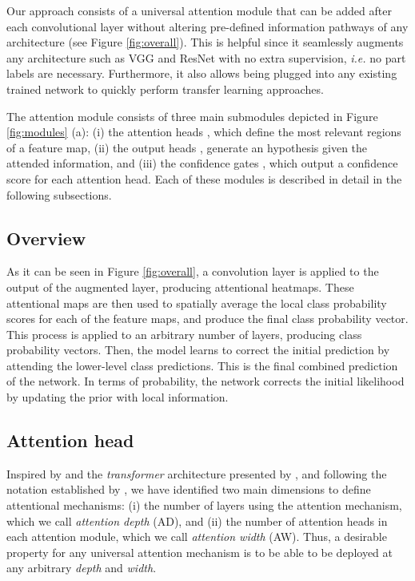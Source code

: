 \documentclass[runningheads]{llncs}
\begin{document}
Our approach consists of a universal attention module that can be added after each convolutional layer without altering pre-defined information pathways of any architecture (see Figure \ref{fig:overall}). This is helpful since it seamlessly augments any architecture such as VGG and ResNet with no extra supervision, \emph{i.e.} no part labels are necessary. Furthermore, it also allows being plugged into any existing trained network to quickly perform transfer learning approaches.

The attention module consists of three main submodules depicted in Figure \ref{fig:modules} (a): (i) the attention heads , which define the most relevant regions of a feature map, (ii) the output heads , generate an hypothesis given the attended information, and (iii) the confidence gates , which output a confidence score for each attention head. Each of these modules is described in detail in the following subsections.

\subsection{Overview}
As it can be seen in Figure \ref{fig:overall}, a convolution layer is applied to the output of the augmented layer, producing  attentional heatmaps. These attentional maps are then used to spatially average the local class probability scores for each of the feature maps, and produce the final class probability vector. This process is applied to an arbitrary number  of layers, producing  class probability vectors. Then, the model learns to correct the initial prediction by attending the lower-level class predictions. This is the final combined prediction of the network. In terms of probability, the network corrects the initial likelihood by updating the prior with local information.

\subsection{Attention head}
Inspired by \cite{zhao2017diversified} and the \emph{transformer} architecture presented by \cite{vaswani2017attention}, and following the notation established by \cite{Zagoruyko2016WRN}, we have identified two main dimensions to define attentional mechanisms: (i) the number of layers using the attention mechanism, which we call \emph{attention depth} (AD), and (ii) the number of attention heads in each attention module, which we call \emph{attention width} (AW). Thus, a desirable property for any universal attention mechanism is to be able to be deployed at any arbitrary \emph{depth} and \emph{width}. 
\end{document}
